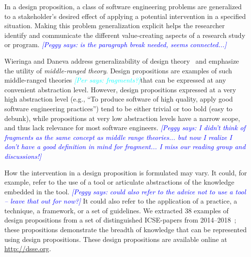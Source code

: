 \documentclass[graybox]{svmult}
\newcommand{\emelie}[1]{\textcolor{red}{{\it [Emelie says: #1]}}}
\newcommand{\peggy}[1]{\textcolor{blue}{{\it [Peggy says: #1]}}}
\newcommand{\per}[1]{\textcolor{cyan}{{\it [Per says: #1]}}}
\newcommand{\emelie}[1]{}
\newcommand{\peggy}[1]{}
\newcommand{\per}[1]{}
\begin{document}
In a design proposition, a class of software engineering problems are generalized to a stakeholder's desired effect of applying a potential intervention in a specified situation. 
Making this problem generalization explicit helps the researcher identify and communicate the different value-creating aspects of a research study or program.
\peggy{is the paragraph break needed, seems connected...}

Wieringa and Daneva address generalizability of design theory~\cite{wieringa_six_2015} and emphasize the utility of \emph{middle-ranged theory}. %
Design propositions are examples of such middle-ranged theories \per{fragments?}that can be expressed at any convenient abstraction level. However, design propositions expressed at a very high abstraction level (e.g., ``To produce software of high quality, apply good software engineering practices'') tend to be either trivial or too bold (easy to debunk), while propositions at very low abstraction levels have a narrow scope, and thus lack relevance for most software engineers. 
\peggy{I didn't think of fragments as the same concept as middle range theories... but now I realize I don't have a good definition in mind for fragment... I miss our reading group and discussions!}

How the intervention in a design proposition is formulated may vary. It could, for example, refer to the use of a tool or articulate abstractions of the knowledge embedded in the tool.
\peggy{could also refer to the advice not to use a tool -- leave that out for now?}
 It could also refer to the application of a practice, a technique, a framework, or a set of guidelines. We extracted 38 examples of design propositions from a set of distinguished ICSE-papers from 2014--2018~\cite{Engstrom19arxiv}; these propositions demonstrate the breadth of knowledge that can be represented using design propositions. These design propositions are available online at \url{http://dsse.org}.
\end{document}
